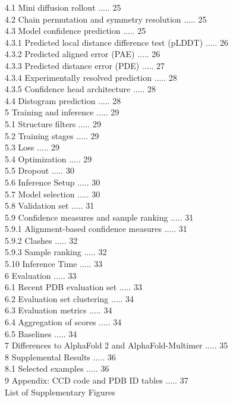 \documentclass[10pt]{article}
\begin{document}
4.1 Mini diffusion rollout ..... 25\\
4.2 Chain permutation and symmetry resolution ..... 25\\
4.3 Model confidence prediction ..... 25\\
4.3.1 Predicted local distance difference test (pLDDT) ..... 26\\
4.3.2 Predicted aligned error (PAE) ..... 26\\
4.3.3 Predicted distance error (PDE) ..... 27\\
4.3.4 Experimentally resolved prediction ..... 28\\
4.3.5 Confidence head architecture ..... 28\\
4.4 Distogram prediction ..... 28\\
5 Training and inference ..... 29\\
5.1 Structure filters ..... 29\\
5.2 Training stages ..... 29\\
5.3 Loss ..... 29\\
5.4 Optimization ..... 29\\
5.5 Dropout ..... 30\\
5.6 Inference Setup ..... 30\\
5.7 Model selection ..... 30\\
5.8 Validation set ..... 31\\
5.9 Confidence measures and sample ranking ..... 31\\
5.9.1 Alignment-based confidence measures ..... 31\\
5.9.2 Clashes ..... 32\\
5.9.3 Sample ranking ..... 32\\
5.10 Inference Time ..... 33\\
6 Evaluation ..... 33\\
6.1 Recent PDB evaluation set ..... 33\\
6.2 Evaluation set clustering ..... 34\\
6.3 Evaluation metrics ..... 34\\
6.4 Aggregation of scores ..... 34\\
6.5 Baselines ..... 34\\
7 Differences to AlphaFold 2 and AlphaFold-Multimer ..... 35\\
8 Supplemental Results ..... 36\\
8.1 Selected examples ..... 36\\
9 Appendix: CCD code and PDB ID tables ..... 37\\
List of Supplementary Figures\\
\end{document}
